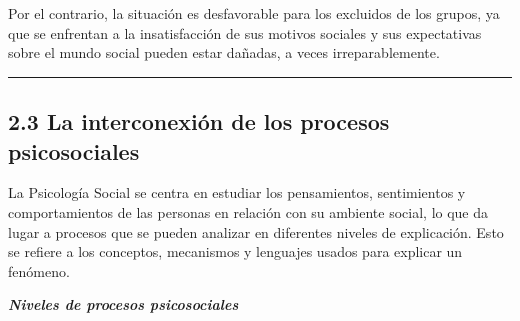 \documentclass[
]{website}
\begin{document}
Por el contrario, la situación es desfavorable para los excluidos de los grupos, ya que se enfrentan a la insatisfacción de sus motivos sociales y sus expectativas sobre el mundo social pueden estar dañadas, a veces irreparablemente.

\begin{center}\rule{0.5\linewidth}{0.5pt}\end{center}

\subsection*{2.3 La interconexión de los procesos psicosociales}\label{subtema2_3}

La Psicología Social se centra en estudiar los pensamientos, sentimientos y comportamientos de las personas en relación con su ambiente social, lo que da lugar a procesos que se pueden analizar en diferentes niveles de explicación. Esto se refiere a los conceptos, mecanismos y lenguajes usados para explicar un fenómeno.

\textbf{\emph{Niveles de procesos psicosociales}}
\end{document}
